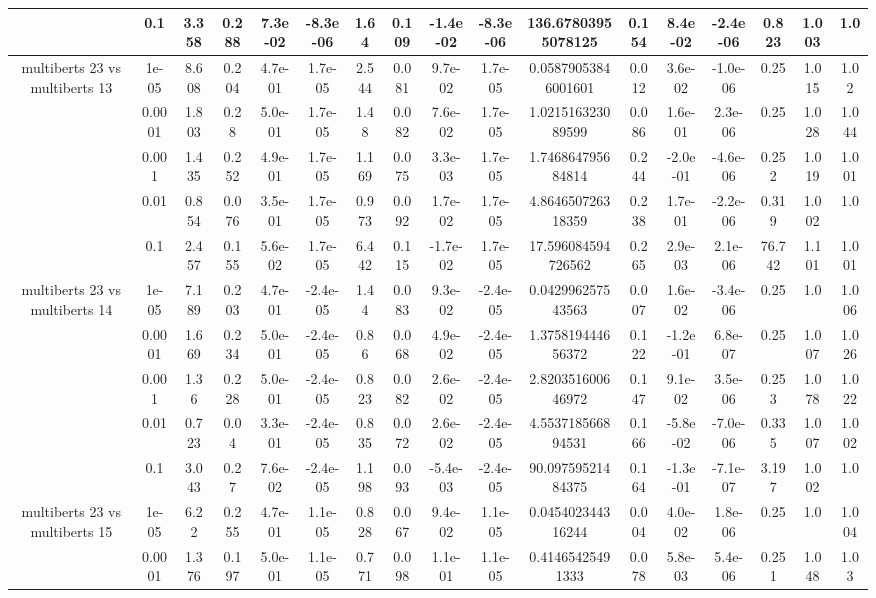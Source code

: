 \begin{tabular}{|c|c|c|c|c|c|c|c|c|c|c|c|c|c|c|c|c|}
 & 0.1 & 3.358 & 0.288 & 7.3e-02 & -8.3e-06 & 1.64 & 0.109 & -1.4e-02 & -8.3e-06 & 136.67803955078125 & 0.154 & 8.4e-02 & -2.4e-06 & 0.823 & 1.003 & 1.0 \\
\hline
\multirow{5}{*}{multiberts 23 vs multiberts 13} & 1e-05 & 8.608 & 0.204 & 4.7e-01 & 1.7e-05 & 2.544 & 0.081 & 9.7e-02 & 1.7e-05 & 0.05879053846001601 & 0.012 & 3.6e-02 & -1.0e-06 & 0.25 & 1.015 & 1.02 \\
 & 0.0001 & 1.803 & 0.28 & 5.0e-01 & 1.7e-05 & 1.48 & 0.082 & 7.6e-02 & 1.7e-05 & 1.021516323089599 & 0.086 & 1.6e-01 & 2.3e-06 & 0.25 & 1.028 & 1.044 \\
 & 0.001 & 1.435 & 0.252 & 4.9e-01 & 1.7e-05 & 1.169 & 0.075 & 3.3e-03 & 1.7e-05 & 1.746864795684814 & 0.244 & -2.0e-01 & -4.6e-06 & 0.252 & 1.019 & 1.001 \\
 & 0.01 & 0.854 & 0.076 & 3.5e-01 & 1.7e-05 & 0.973 & 0.092 & 1.7e-02 & 1.7e-05 & 4.864650726318359 & 0.238 & 1.7e-01 & -2.2e-06 & 0.319 & 1.002 & 1.0 \\
 & 0.1 & 2.457 & 0.155 & 5.6e-02 & 1.7e-05 & 6.442 & 0.115 & -1.7e-02 & 1.7e-05 & 17.596084594726562 & 0.265 & 2.9e-03 & 2.1e-06 & 76.742 & 1.101 & 1.001 \\
\hline
\multirow{5}{*}{multiberts 23 vs multiberts 14} & 1e-05 & 7.189 & 0.203 & 4.7e-01 & -2.4e-05 & 1.44 & 0.083 & 9.3e-02 & -2.4e-05 & 0.042996257543563 & 0.007 & 1.6e-02 & -3.4e-06 & 0.25 & 1.0 & 1.006 \\
 & 0.0001 & 1.669 & 0.234 & 5.0e-01 & -2.4e-05 & 0.86 & 0.068 & 4.9e-02 & -2.4e-05 & 1.375819444656372 & 0.122 & -1.2e-01 & 6.8e-07 & 0.25 & 1.007 & 1.026 \\
 & 0.001 & 1.36 & 0.228 & 5.0e-01 & -2.4e-05 & 0.823 & 0.082 & 2.6e-02 & -2.4e-05 & 2.820351600646972 & 0.147 & 9.1e-02 & 3.5e-06 & 0.253 & 1.078 & 1.022 \\
 & 0.01 & 0.723 & 0.04 & 3.3e-01 & -2.4e-05 & 0.835 & 0.072 & 2.6e-02 & -2.4e-05 & 4.553718566894531 & 0.166 & -5.8e-02 & -7.0e-06 & 0.335 & 1.007 & 1.002 \\
 & 0.1 & 3.043 & 0.27 & 7.6e-02 & -2.4e-05 & 1.198 & 0.093 & -5.4e-03 & -2.4e-05 & 90.09759521484375 & 0.164 & -1.3e-01 & -7.1e-07 & 3.197 & 1.002 & 1.0 \\
\hline
\multirow{5}{*}{multiberts 23 vs multiberts 15} & 1e-05 & 6.22 & 0.255 & 4.7e-01 & 1.1e-05 & 0.828 & 0.067 & 9.4e-02 & 1.1e-05 & 0.045402344316244 & 0.004 & 4.0e-02 & 1.8e-06 & 0.25 & 1.0 & 1.004 \\
 & 0.0001 & 1.376 & 0.197 & 5.0e-01 & 1.1e-05 & 0.771 & 0.098 & 1.1e-01 & 1.1e-05 & 0.41465425491333 & 0.078 & 5.8e-03 & 5.4e-06 & 0.251 & 1.048 & 1.03 \\

\end{tabular}
